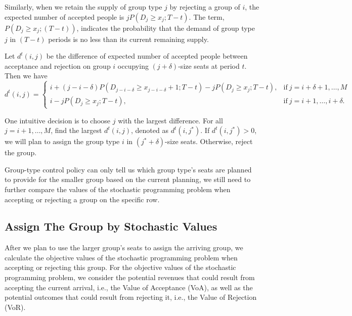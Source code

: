 Similarly, when we retain the supply of group type $j$ by rejecting a group of $i$, the expected number of accepted people is $j P(D_{j} \geq x_{j}; T-t)$. The term, $P(D_{j} \geq x_{j}; (T-t))$, indicates the probability that the demand of group type $j$ in $(T-t)$ periods is no less than its current remaining supply.

Let $d^{t}(i,j)$ be the difference of expected number of accepted people between acceptance and rejection on group $i$ occupying $(j+\delta)$-size seats at period $t$. Then we have
\begin{equation*}
	d^{t}(i,j) = \begin{cases}
    i + (j-i-\delta)P(D_{j-i-\delta} \geq x_{j-i-\delta}+1; T-t) - j P(D_{j} \geq x_{j}; T-t), &\text{if}~ j = i+\delta+1, \ldots, M \\
    i - j P(D_{j} \geq x_{j}; T-t), &\text{if}~ j = i+1, \ldots, i+\delta.
		\end{cases}
\end{equation*}



One intuitive decision is to choose $j$ with the largest difference. For all $j = i+1, \ldots, M$, find the largest $d^{t}(i,j)$, denoted as $d^{t}(i,j^{*})$. If $d^{t}(i,j^{*}) >0$, we will plan to assign the group type $i$ in $(j^{*}+\delta)$-size seats. Otherwise, reject the group.

Group-type control policy can only tell us which group type's seats are planned to provide for the smaller group based on the current planning, we still need to further compare the values of the stochastic programming problem when accepting or rejecting a group on the specific row. 


\subsection{Assign The Group by Stochastic Values}

After we plan to use the larger group's seats to assign the arriving group, we calculate the objective values of the stochastic programming problem when accepting or rejecting this group. For the objective values of the stochastic programming problem, we consider the potential revenues that could result from accepting the current arrival, i.e., the Value of Acceptance (VoA), as well as the potential outcomes that could result from rejecting it, i.e., the Value of Rejection (VoR). 

